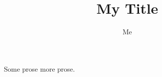 \usepackage{a}
\usepackage{b}
\title{My Title}
\author{Me}
Some prose
\setlength{\parindent}{0pt}
more prose.
